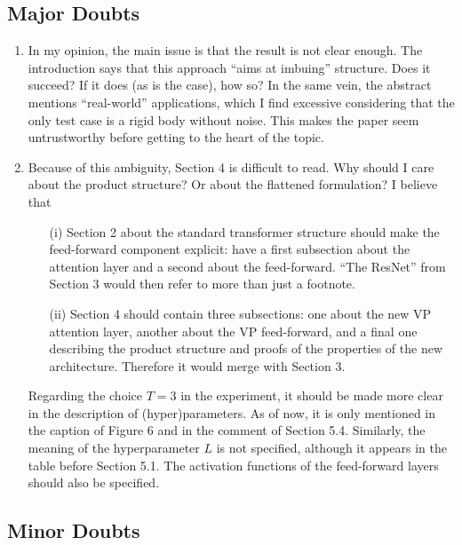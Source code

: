 \documentclass{article}
\begin{document}
\subsection*{Major Doubts}
\begin{enumerate}
    \item In my opinion, the main issue is that the result is not clear enough. The introduction says that this approach ``aims at imbuing'' structure. Does it succeed? If it does (as is the case), how so? In the same vein, the abstract mentions ``real-world'' applications, which I find excessive considering that the only test case is a rigid body without noise. This makes the paper seem untrustworthy before getting to the heart of the topic.
    
    \item Because of this ambiguity, Section 4 is difficult to read. Why should I care about the product structure? Or about the flattened formulation? I believe that 
    \begin{enumerate} 
    \item[(i)] Section 2 about the standard transformer structure should make the feed-forward component explicit: have a first subsection about the attention layer and a second about the feed-forward. ``The ResNet'' from Section 3 would then refer to more than just a footnote.
    \item[(ii)] Section 4 should contain three subsections: one about the new VP attention layer, another about the VP feed-forward, and a final one describing the product structure and proofs of the properties of the new architecture. Therefore it would merge with Section 3.
    \end{enumerate}
    Regarding the choice $T = 3$ in the experiment, it should be made more clear in the description of (hyper)parameters. As of now, it is only mentioned in the caption of Figure 6 and in the comment of Section 5.4. Similarly, the meaning of the hyperparameter $L$ is not specified, although it appears in the table before Section 5.1. The activation functions of the feed-forward layers should also be specified.
\end{enumerate}

\subsection*{Minor Doubts}
\end{document}
